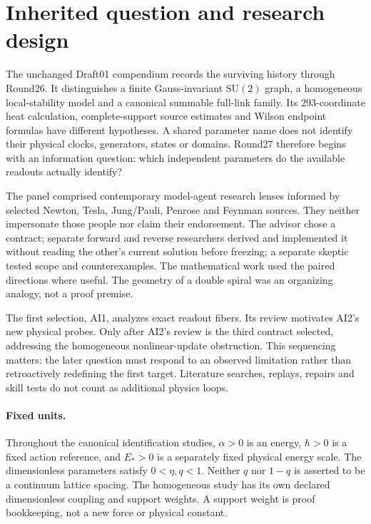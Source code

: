\section{Inherited question and research design}
The unchanged Draft01 compendium records the surviving history through Round26. It distinguishes a finite Gauss-invariant $\mathrm{SU}(2)$ graph, a homogeneous local-stability model and a canonical summable full-link family. Its 293-coordinate heat calculation, complete-support source estimates and Wilson endpoint formulas have different hypotheses. A shared parameter name does not identify their physical clocks, generators, states or domains. Round27 therefore begins with an information question: which independent parameters do the available readouts actually identify?

The panel comprised contemporary model-agent research lenses informed by selected Newton, Tesla, Jung/Pauli, Penrose and Feynman sources. They neither impersonate those people nor claim their endorsement. The advisor chose a contract; separate forward and reverse researchers derived and implemented it without reading the other's current solution before freezing; a separate skeptic tested scope and counterexamples. The mathematical work used the paired directions where useful. The geometry of a double spiral was an organizing analogy, not a proof premise.

The first selection, AI1, analyzes exact readout fibers. Its review motivates AI2's new physical probes. Only after AI2's review is the third contract selected, addressing the homogeneous nonlinear-update obstruction. This sequencing matters: the later question must respond to an observed limitation rather than retroactively redefining the first target. Literature searches, replays, repairs and skill tests do not count as additional physics loops.

\paragraph{Fixed units.} Throughout the canonical identification studies, $\alpha>0$ is an energy, $\hbar>0$ is a fixed action reference, and $E_*>0$ is a separately fixed physical energy scale. The dimensionless parameters satisfy $0<\eta,q<1$. Neither $q$ nor $1-q$ is asserted to be a continuum lattice spacing. The homogeneous study has its own declared dimensionless coupling and support weights. A support weight is proof bookkeeping, not a new force or physical constant.

